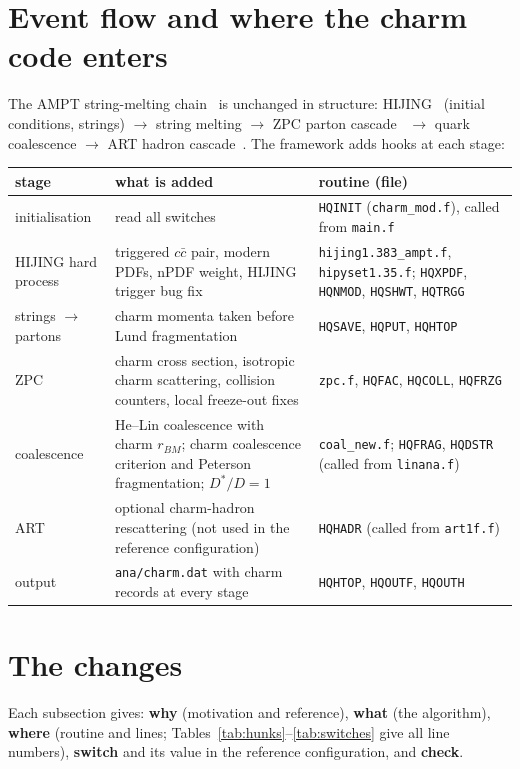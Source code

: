 \documentclass[11pt,a4paper]{article}
\newcommand{\code}[1]{\texttt{#1}}
\begin{document}
\section{Event flow and where the charm code enters}
The AMPT string-melting chain~\cite{ampt2005} is unchanged in structure:
HIJING~\cite{hijing} (initial conditions, strings) $\to$ string melting $\to$
ZPC parton cascade~\cite{zpc} $\to$ quark coalescence $\to$ ART hadron cascade~\cite{art}.
The framework adds hooks at each stage:

\begin{center}\small
\begin{tabular}{@{}p{3.4cm}p{6.2cm}p{5.6cm}@{}}
\toprule stage & what is added & routine (file) \\ \midrule
initialisation & read all switches & \code{HQINIT} (\code{charm\_mod.f}), called from \code{main.f} \\
HIJING hard process & triggered $c\bar c$ pair, modern PDFs, nPDF weight, HIJING trigger bug fix & \code{hijing1.383\_ampt.f}, \code{hipyset1.35.f}; \code{HQXPDF}, \code{HQNMOD}, \code{HQSHWT}, \code{HQTRGG} \\
strings $\to$ partons & charm momenta taken before Lund fragmentation & \code{HQSAVE}, \code{HQPUT}, \code{HQHTOP} \\
ZPC & charm cross section, isotropic charm scattering, collision counters, local freeze-out fixes & \code{zpc.f}, \code{HQFAC}, \code{HQCOLL}, \code{HQFRZG} \\
coalescence & He--Lin coalescence with charm $r_{BM}$; charm coalescence criterion and Peterson fragmentation; $D^*/D=1$ & \code{coal\_new.f}; \code{HQFRAG}, \code{HQDSTR} (called from \code{linana.f}) \\
ART & optional charm-hadron rescattering (not used in the reference configuration) & \code{HQHADR} (called from \code{art1f.f}) \\
output & \code{ana/charm.dat} with charm records at every stage & \code{HQHTOP}, \code{HQOUTF}, \code{HQOUTH} \\
\bottomrule
\end{tabular}
\end{center}

\section{The changes}
Each subsection gives: \textbf{why} (motivation and reference), \textbf{what} (the algorithm), \textbf{where} (routine and
lines; Tables~\ref{tab:hunks}--\ref{tab:switches} give all line numbers), \textbf{switch} and its value in the reference
configuration, and \textbf{check}.
\end{document}

